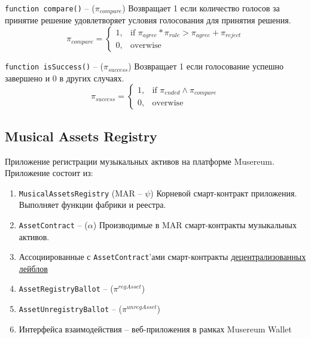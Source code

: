 \documentclass[12pt]{report}
\def\code#1{\colorbox{light-gray}{\texttt{#1}}}
\begin{document}
\begin{multicols}{2}
\code{function compare()} – ($\pi_{compare}$)\hfill\null\linebreak
Возвращает 1 если количество голосов за принятие решение удовлетворяет условия голосования для принятия решения.
\begin{equation}
\pi_{compare} = \begin{cases}
	1, & \text{if }\pi_{agree} * \pi_{rule} > \pi_{agree} + \pi_{reject} \\
	0, & \text{overwise}
\end{cases}
\end{equation}

\code{function isSuccess()} – ($\pi_{success}$)\hfill\null\linebreak
Возвращает 1 если голосование успешно завершено и 0 в других случаях.
\begin{equation}
\pi_{success} = \begin{cases}
	1, & \text{if } \pi_{ended} \wedge \pi_{compare} \\
	0, & \text{overwise }
\end{cases}
\end{equation}
\end{multicols}
\subsection{Musical Assets Registry}
\label{tech-apps-assets}
\begin{multicols}{2}
Приложение регистрации музыкальных активов на платформе Musereum. Приложение состоит из:
\begin{enumerate}
	\item \code{MusicalAssetsRegistry} (MAR – $\psi$)\hfill\null\linebreak
	Корневой смарт-контракт приложения. Выполняет функции фабрики и реестра.
	\item \code{AssetContract} – ($\alpha$)\hfill\null\linebreak
	Производимые в MAR смарт-контракты музыкальных активов.
	\item Ассоциированные с \code{AssetContract}'ами смарт-контракты \hyperref[tech-apps-dal]{децентрализованных лейблов}
	\item \code{AssetRegistryBallot} – ($\pi^{regAsset}$)
	\item \code{AssetUnregistryBallot} – ($\pi^{unregAsset}$)
	\item Интерфейса взаимодействия – веб-приложения в рамках Musereum Wallet
\end{enumerate}
\end{multicols}
\end{document}
